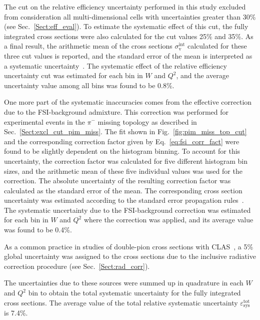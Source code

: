 \documentclass[prc,twocolumn,superscriptaddress,showpacs,amssymb,amsmath,amsfonts,aps,nofootinbib]{revtex4-1}
\begin{document}
The cut on the relative efficiency uncertainty performed in this study excluded from consideration all multi-dimensional cells with uncertainties greater than 30\% (see Sec.\!~\ref{Sect:eff_eval}). To estimate the systematic effect of this cut, the fully integrated cross sections were also calculated for the cut values 25\% and 35\%. As a final result, the arithmetic mean of the cross sections $\sigma_{\text{v}}^{\text{int}}$ calculated for these three cut values is reported, and the standard error of the mean is interpreted as a systematic uncertainty~\cite{my_an_note:2020, my_thesis:2021}. The systematic effect of the relative efficiency uncertainty cut was estimated for each bin in $W$ and $Q^{2}$, and the average uncertainty value among all bins was found to be 0.8\%.


One more part of the systematic inaccuracies comes from the effective correction due to the FSI-background admixture. This correction was performed for experimental events in the $\pi^{-}$ missing topology as described in Sec.\!~\ref{Sect:excl_cut_pim_miss}. The fit shown in Fig.\!~\ref{fig:pim_miss_top_cut} and the corresponding correction factor given by Eq.\!~\eqref{eq:fsi_corr_fact} were found to be slightly dependent on the histogram binning. To account for this uncertainty, the correction factor was calculated for five different histogram bin sizes, and the arithmetic mean of these five individual values was used for the correction. The absolute uncertainty of the resulting correction factor was calculated as the standard error of the mean. The corresponding cross section uncertainty was estimated according to the standard error propagation rules~\cite{my_an_note:2020, my_thesis:2021}. The systematic uncertainty due to the FSI-background correction was estimated for each bin in $W$ and $Q^{2}$ where the correction was applied, and its average value was found to be 0.4\%.


As a common practice in studies of double-pion cross sections with CLAS~\cite{Rip_an_note:2002,Ripani:2002ss,Fed_an_note:2007,Fedotov:2008aa,Isupov:2017lnd,Arjun,Fed_an_note:2017,Fed_paper_2018}, a 5\% global uncertainty was assigned to the cross sections due to the inclusive radiative correction procedure (see Sec.\!~\ref{Sect:rad_corr}).


The uncertainties due to these sources were summed up in quadrature in each $W$ and $Q^{2}$ bin to obtain the total systematic uncertainty for the fully integrated cross sections. The average value of the total relative systematic uncertainty $\varepsilon_{\text{sys}}^{\text{tot}}$ is 7.4\%.
\end{document}
